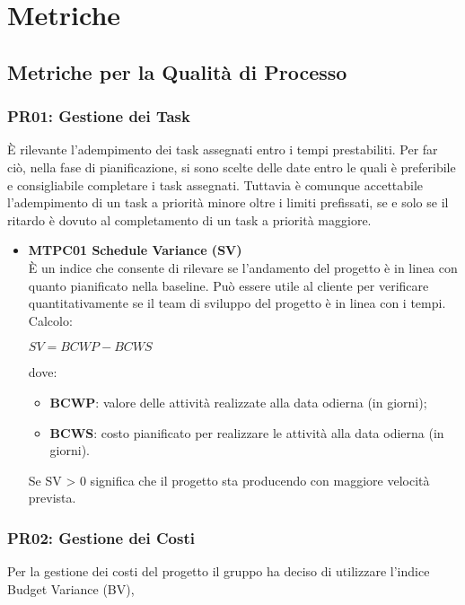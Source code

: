 \section{Metriche}
\label{AMe}

\subsection{Metriche per la Qualità di Processo}

\subsubsection{PR01: Gestione dei Task}
È rilevante l'adempimento dei task assegnati entro i tempi prestabiliti. Per far ciò, nella fase di pianificazione, si sono scelte delle date entro le quali è preferibile e consigliabile completare i task assegnati. Tuttavia è comunque accettabile l'adempimento di un task a priorità minore oltre i limiti prefissati, se e solo se il ritardo è dovuto al completamento di un task a priorità maggiore.

\begin{itemize}

	\item \textbf{MTPC01 Schedule Variance (SV)}\-\\
È un indice che consente di rilevare se l'andamento del progetto è in linea con quanto pianificato nella baseline\glossario. Può essere utile al cliente per verificare quantitativamente se il team di sviluppo del progetto è in linea con i tempi. \-\\
Calcolo:\-\\
\begin{center}
	$SV = BCWP - BCWS$
\end{center}
dove:
\begin{itemize}
	\item \textbf{BCWP}: valore delle attività realizzate alla data odierna (in giorni);
	\item \textbf{BCWS}: costo pianificato per realizzare le attività alla data odierna (in giorni).
\end{itemize}
Se SV > 0 significa che il progetto sta producendo con maggiore velocità prevista.

\end{itemize}

\subsubsection{PR02: Gestione dei Costi}
Per la gestione dei costi del progetto il gruppo ha deciso di utilizzare l'indice Budget Variance (BV),

